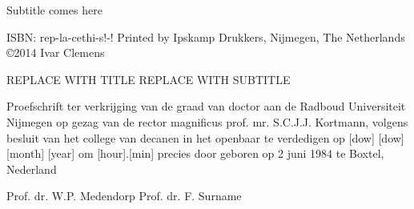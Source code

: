 \begin{titlepage}

\fontsize{12pt}{14pt}\selectfont

\qquad

\fontsize{17.28pt}{21pt}\selectfont

\noindent {}
\fontsize{15.28pt}{20pt}\selectfont
 \npar \noindent Subtitle comes here

\fontsize{12pt}{14pt}\selectfont

\vspace{1cm}

\noindent {}

\vspace{3cm}

\end{titlepage}

\thispagestyle{empty}


\clearpage
\pagestyle{empty}
	
\null
\vfill
\noindent ISBN: rep-la-cethi-s!-!
\npar
\noindent Printed by Ipskamp Drukkers, Nijmegen, The Netherlands
\npar
\noindent \copyright 2014 Ivar Clemens



\begin{titlepage}

\fontsize{12pt}{14pt}\selectfont
\vspace*{\fill}
\begin{center}

\fontsize{17.28pt}{21pt}\selectfont

{\textsc{REPLACE WITH TITLE}}
 \npar REPLACE WITH SUBTITLE

\fontsize{12pt}{14pt}\selectfont

\vspace{1cm}
Proefschrift
\vspace{1cm}
\npar
ter verkrijging van de graad van doctor
\npar
aan de Radboud Universiteit Nijmegen
\npar
op gezag van de rector magnificus prof. mr. S.C.J.J. Kortmann, 
\npar
volgens besluit van het college van decanen
\npar
in het openbaar te verdedigen op [dow] [dow] [month] [year]
\npar
om [hour].[min] precies
\npar
\vspace{1cm}
door
\npar
\vspace{1cm}
\npar
geboren op 2 juni 1984
\npar
te Boxtel, Nederland

\vspace{2.8cm}

\fontsize{17.28pt}{21pt}\selectfont

\end{center}
\end{titlepage}

\thispagestyle{empty}



\clearpage
\pagestyle{empty}
	
\noindent {}
\noindent \npar Prof. dr. W.P. Medendorp
\npar
\vspace{0.5cm}
\noindent {}
\noindent \npar Prof. dr. F. Surname
